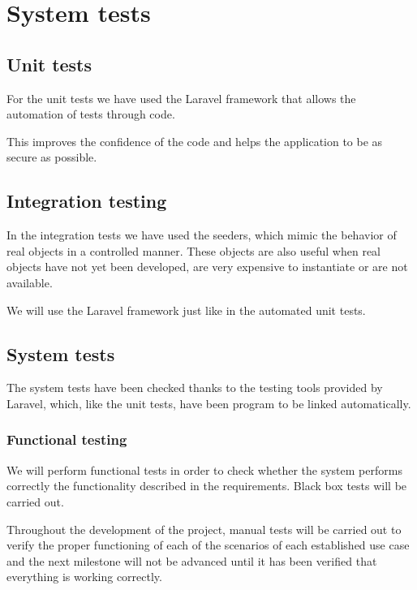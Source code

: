 \chapter{System tests}
\section{Unit tests}
For the unit tests we have used the Laravel framework that allows the automation of tests through code.

This improves the confidence of the code and helps the application to be as secure as possible.

\section{Integration testing}
In the integration tests we have used the seeders, which mimic the behavior of real objects in a controlled manner. These objects are also useful when real objects have not yet been developed, are very expensive to instantiate or are not available.

We will use the Laravel framework just like in the automated unit tests.

\section{System tests}
The system tests have been checked thanks to the testing tools provided by Laravel, which, like the unit tests, have been program to be linked automatically.

\subsection{Functional testing}
We will perform functional tests in order to check whether the system performs correctly the functionality described in the requirements. Black box tests will be carried out.

Throughout the development of the project, manual tests will be carried out to verify the proper functioning of each of the scenarios of each established use case and the next milestone will not be advanced until it has been verified that everything is working correctly.

